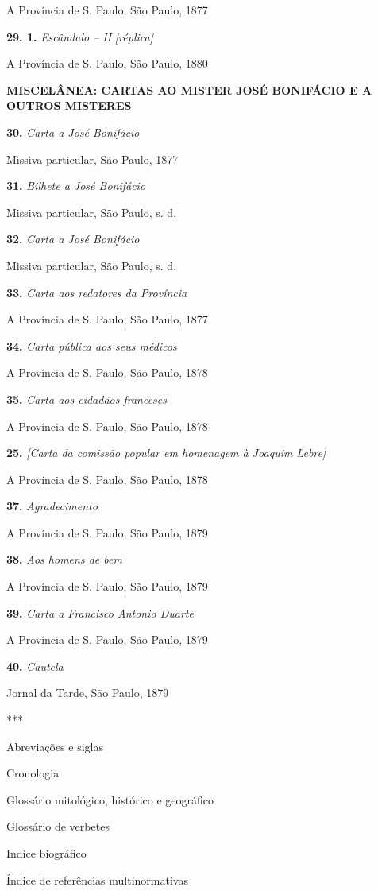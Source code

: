 A Província de S. Paulo, São Paulo, 1877

\textbf{29. 1.} \emph{Escândalo -- II} \emph{{[}réplica{]}}

A Província de S. Paulo, São Paulo, 1880

\textbf{MISCELÂNEA: CARTAS AO MISTER JOSÉ BONIFÁCIO E A OUTROS MISTERES}

\textbf{30.} \emph{Carta a José Bonifácio}

Missiva particular, São Paulo, 1877

\textbf{31.} \emph{Bilhete a José Bonifácio}

Missiva particular, São Paulo, s. d.

\textbf{32.} \emph{Carta a José Bonifácio}

Missiva particular, São Paulo, s. d.

\textbf{33.} \emph{Carta aos redatores da Província}

A Província de S. Paulo, São Paulo, 1877

\textbf{34.} \emph{Carta pública aos seus médicos}

A Província de S. Paulo, São Paulo, 1878

\textbf{35.} \emph{Carta aos cidadãos franceses}

A Província de S. Paulo, São Paulo, 1878

\textbf{25.} \emph{{[}Carta da comissão popular em homenagem à Joaquim
Lebre{]}}

A Província de S. Paulo, São Paulo, 1878

\textbf{37.} \emph{Agradecimento}

A Província de S. Paulo, São Paulo, 1879

\textbf{38.} \emph{Aos homens de bem}

A Província de S. Paulo, São Paulo, 1879

\textbf{39.} \emph{Carta a Francisco Antonio Duarte}

A Província de S. Paulo, São Paulo, 1879

\textbf{40.} \emph{Cautela}

Jornal da Tarde, São Paulo, 1879

***

Abreviações e siglas

Cronologia

Glossário mitológico, histórico e geográfico

Glossário de verbetes

Indíce biográfico

Índice de referências multinormativas

